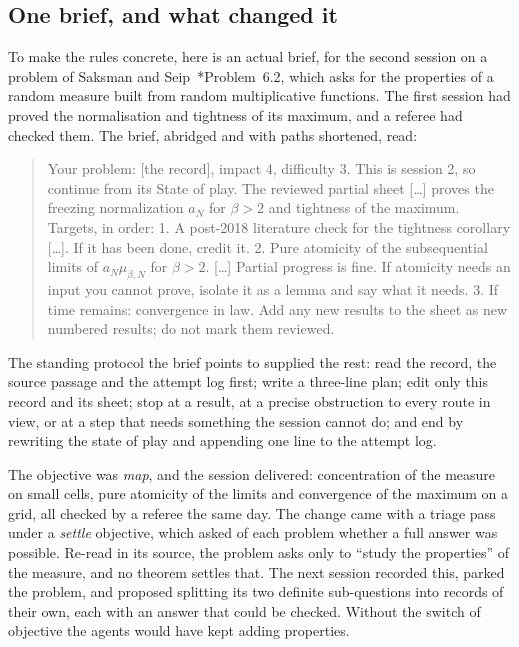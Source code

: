 \documentclass[11pt]{amsart}
\begin{document}
\subsection*{One brief, and what changed it}
To make the rules concrete, here is an actual brief, for the second session on
a problem of Saksman and Seip~\cite{saksman-seip}*{Problem~6.2}, which asks for
the properties of a random measure built from random multiplicative functions.
The first session had proved the normalisation and tightness of its maximum,
and a referee had checked them. The brief, abridged and with paths shortened,
read:
\begin{quote}\small
  Your problem: [the record], impact 4, difficulty 3. This is session 2, so
  continue from its State of play. The reviewed partial sheet [\dots] proves
  the freezing normalization $a_N$ for $\beta>2$ and tightness of the
  maximum. Targets, in order: 1. A post-2018 literature check for the
  tightness corollary [\dots]. If it has been done, credit it. 2. Pure
  atomicity of the subsequential limits of $a_N\mu_{\beta,N}$ for $\beta>2$.
    [\dots] Partial progress is fine. If atomicity needs an input you cannot
  prove, isolate it as a lemma and say what it needs. 3. If time remains:
  convergence in law. Add any new results to the sheet as new numbered
  results; do not mark them reviewed.
\end{quote}
The standing protocol the brief points to supplied the rest: read the record,
the source passage and the attempt log first; write a three-line plan; edit
only this record and its sheet; stop at a result, at a precise obstruction to
every route in view, or at a step that needs something the session cannot do;
and end by rewriting the state of play and appending one line to the attempt
log.

The objective was \emph{map}, and the session delivered: concentration of the
measure on small cells, pure atomicity of the limits and convergence of the
maximum on a grid, all checked by a referee the same day. The change came with
a triage pass under a \emph{settle} objective, which asked of each problem
whether a full answer was possible. Re-read in its source, the problem asks
only to ``study the properties'' of the measure, and no theorem settles that.
The next session recorded this, parked the problem, and proposed splitting its
two definite sub-questions into records of their own, each with an answer that
could be checked. Without the switch of objective the agents would have kept
adding properties.
\end{document}
